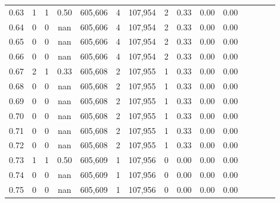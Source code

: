 \begin{tabular}{rrrcrrrrrrrrrrr}
0.63 &       1 &      1 &                                       0.50 &  605,606 &        4 &  107,954 &        2 &  0.33 &  0.00 &                         0.00 \\
0.64 &       0 &      0 &                                        nan &  605,606 &        4 &  107,954 &        2 &  0.33 &  0.00 &                         0.00 \\
0.65 &       0 &      0 &                                        nan &  605,606 &        4 &  107,954 &        2 &  0.33 &  0.00 &                         0.00 \\
0.66 &       0 &      0 &                                        nan &  605,606 &        4 &  107,954 &        2 &  0.33 &  0.00 &                         0.00 \\
0.67 &       2 &      1 &                                       0.33 &  605,608 &        2 &  107,955 &        1 &  0.33 &  0.00 &                         0.00 \\
0.68 &       0 &      0 &                                        nan &  605,608 &        2 &  107,955 &        1 &  0.33 &  0.00 &                         0.00 \\
0.69 &       0 &      0 &                                        nan &  605,608 &        2 &  107,955 &        1 &  0.33 &  0.00 &                         0.00 \\
0.70 &       0 &      0 &                                        nan &  605,608 &        2 &  107,955 &        1 &  0.33 &  0.00 &                         0.00 \\
0.71 &       0 &      0 &                                        nan &  605,608 &        2 &  107,955 &        1 &  0.33 &  0.00 &                         0.00 \\
0.72 &       0 &      0 &                                        nan &  605,608 &        2 &  107,955 &        1 &  0.33 &  0.00 &                         0.00 \\
0.73 &       1 &      1 &                                       0.50 &  605,609 &        1 &  107,956 &        0 &  0.00 &  0.00 &                         0.00 \\
0.74 &       0 &      0 &                                        nan &  605,609 &        1 &  107,956 &        0 &  0.00 &  0.00 &                         0.00 \\
0.75 &       0 &      0 &                                        nan &  605,609 &        1 &  107,956 &        0 &  0.00 &  0.00 &                         0.00 \\

\end{tabular}

